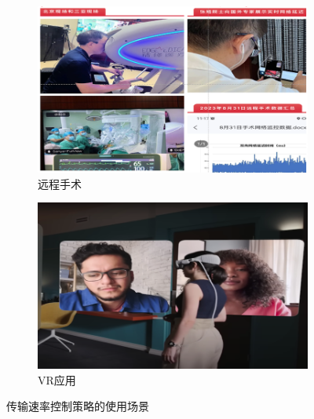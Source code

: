 \begin{figure}[ht]
\vspace{-0.5em} 
\begin{subfigure}[t]{0.48\linewidth} 
  \centering
  \includegraphics[height=0.2\textheight]{figures/applications/surgury.png} %
  \caption{远程手术}
\end{subfigure}%
\begin{subfigure}[t]{0.48\linewidth} 
  \centering
  \includegraphics[height=0.2\textheight]{figures/applications/vr.png} %
  \caption{VR应用}
  \label{fig-chess-game}
\end{subfigure}
\vspace{-1em} %
\caption{传输速率控制策略的使用场景}
\label{fig-apps}
\end{figure}
